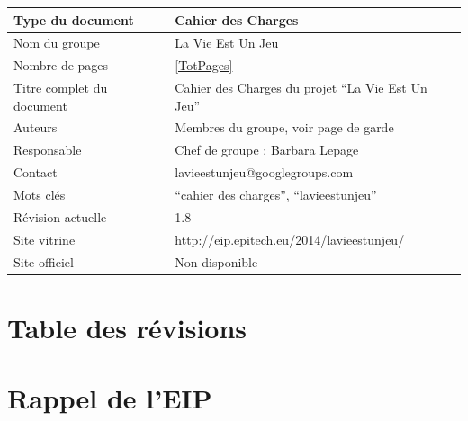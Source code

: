 \documentclass{life-fr}
\begin{document}
\begin{tabular}{ | m{5cm} | m{10cm} | }
  \hline
  Type du document & Cahier des Charges\\
  \hline
  Nom du groupe & La Vie Est Un Jeu\\
  \hline
  Nombre de pages & \ref{TotPages} \\
  \hline
  Titre complet du document & Cahier des Charges du projet ``La Vie Est Un Jeu''\\
  \hline
  Auteurs & Membres du groupe, voir page de garde\\
  \hline
  Responsable & Chef de groupe : Barbara Lepage\\
  \hline
  Contact & lavieestunjeu@googlegroups.com\\
  \hline
  Mots clés & ``cahier des charges'', ``lavieestunjeu''\\
  \hline
  Révision actuelle & 1.8\\
  \hline
  Site vitrine & http://eip.epitech.eu/2014/lavieestunjeu/\\
  \hline
  Site officiel & Non disponible\\
  \hline
\end{tabular}

\chapter*{Table des révisions}

\listofrevisions

\newpage
\hspace{2cm}
\newpage

\tableofcontents

\newpage
\hspace{2cm}
\newpage

\chapter{Rappel de l'EIP}
\end{document}
